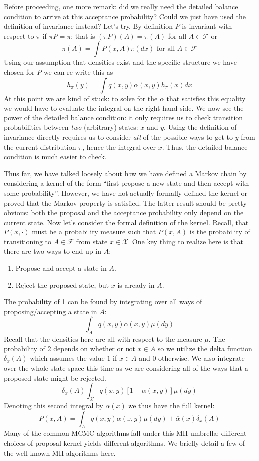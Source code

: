 \documentclass[12pt]{article}
\begin{document}
Before proceeding, one more remark: did we really need the detailed balance condition to arrive at this acceptance probability? Could we just have used the definition of invariance instead?
Let's try. By definition $P$ is invariant with respect to $\pi$ if $\pi P = \pi$; that is $(\pi P)(A) = \pi(A)$ for all $A \in \mathcal{F}$ or 
\[\pi(A) = \int P(x, A) \pi(dx) \text{ for all } A \in \mathcal{F}\]
Using our assumption that densities exist and the specific structure we have chosen for $P$ we can re-write this as
\[h_\pi(y) = \int q(x, y) \alpha(x, y) h_\pi(x) dx\]
At this point we are kind of stuck: to solve for the $\alpha$ that satisfies this equality we would have to evaluate the integral on the right-hand side. We now see the power 
of the detailed balance condition: it only requires us to check transition probabilities between \textit{two} (arbitrary) states: $x$ and $y$. Using the definition of invariance
directly requires us to consider \textit{all} of the possible ways to get to $y$ from the current distribution $\pi$, hence the integral over $x$. Thus, the detailed balance condition
is much easier to check. 

\bigskip

Thus far, we have talked loosely about how we have defined a Markov chain by considering a kernel of the form ``first propose a new state and then accept with some 
probability''. However, we have not actually formally defined the kernel or proved that the Markov property is satisfied. The latter result should be pretty obvious: both the 
proposal and the acceptance probability only depend on the current state. Now let's consider the formal definition of the kernel. Recall, that $P(x, \cdot)$ must be a probability 
measure such that $P(x, A)$ is the probability of transitioning to $A \in \mathcal{F}$ from state $x \in \mathcal{X}$. One key thing to realize here is that there are two ways 
to end up in $A$: 
\begin{enumerate} 
\item Propose and accept a state in $A$. 
\item Reject the proposed state, but $x$ is already in $A$. 
\end{enumerate}
The probability of 1 can be found by integrating over all ways of proposing/accepting a state in $A$: 
\[\int_{A} q(x, y)\alpha(x, y)\mu(dy)\]
Recall that the densities here are all with respect to the measure $\mu$. The probability of 2 depends on whether or not $x \in A$ so we utilize the delta function 
$\delta_x(A)$ which assumes the value $1$ if $x \in A$ and $0$ otherwise. We also integrate over the whole state space this time as we are considering all of the ways
that a proposed state might be rejected. 
\[\delta_x(A)\int_\mathcal{X} q(x, y)[1 - \alpha(x, y)]\mu(dy)\]
Denoting this second integral by $\overline{\alpha}(x)$ we thus have the full kernel: 
\[P(x, A) = \int_{A} q(x, y)\alpha(x, y)\mu(dy) + \overline{\alpha}(x) \delta_x(A)\]
Many of the common MCMC algorithms fall under this MH umbrella; different choices of proposal kernel yields different algorithms. We briefly detail a few of the well-known 
MH algorithms here. 
\end{document}
